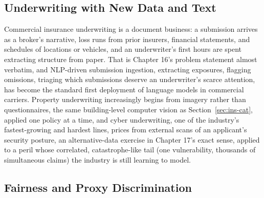 \documentclass[../ai_in_finance]{subfiles}
\begin{document}
\subsection{Underwriting with New Data and Text}
\label{sec:ins-underwriting}

Commercial insurance underwriting is a document business: a submission arrives as a broker's narrative, loss runs from prior insurers, financial statements, and schedules of locations or vehicles, and an underwriter's first hours are spent extracting structure from paper. That is Chapter 16's problem statement almost verbatim, and NLP-driven submission ingestion, extracting exposures, flagging omissions, triaging which submissions deserve an underwriter's scarce attention, has become the standard first deployment of language models in commercial carriers. Property underwriting increasingly begins from imagery rather than questionnaires, the same building-level computer vision as Section~\ref{sec:ins-cat}, applied one policy at a time, and cyber underwriting, one of the industry's fastest-growing and hardest lines, prices from external scans of an applicant's security posture, an alternative-data exercise in Chapter 17's exact sense, applied to a peril whose correlated, catastrophe-like tail (one vulnerability, thousands of simultaneous claims) the industry is still learning to model.

\subsection{Fairness and Proxy Discrimination}
\label{sec:ins-fairness}
\end{document}
